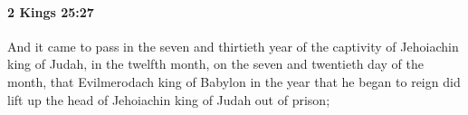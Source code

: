 
		\paragraph{2 Kings 25:27} %
			\label{2KINGS-25-27}

			And it came to pass in the seven and thirtieth year of the captivity of Jehoiachin king of Judah, in the twelfth month, on the seven and twentieth day of the month, that Evilmerodach king of Babylon in the year that he began to reign did lift up the head of Jehoiachin king of Judah out of prison;


